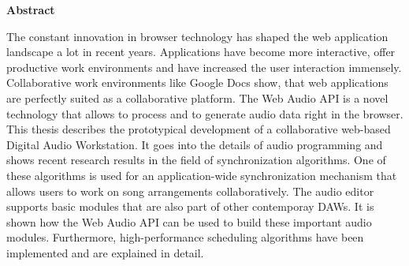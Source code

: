 \thispagestyle{empty}
\noindent \textbf{Abstract}

\noindent The constant innovation in browser technology has shaped the web application landscape a lot in recent years. Applications have become more interactive, offer productive work environments and have increased the user interaction immensely. Collaborative work environments like Google Docs show, that web applications are perfectly suited as a collaborative platform. The Web Audio API is a novel technology that allows to process and to generate audio data right in the browser. This thesis describes the prototypical development of a collaborative web-based Digital Audio Workstation. It goes into the details of audio programming and shows recent research results in the field of synchronization algorithms. One of these algorithms is used for an application-wide synchronization mechanism that allows users to work on song arrangements collaboratively. The audio editor supports basic modules that are also part of other contemporay DAWs. It is shown how the Web Audio API can be used to build these important audio modules. Furthermore, high-performance scheduling algorithms have been implemented and are explained in detail.